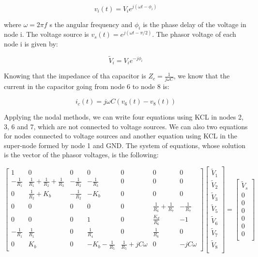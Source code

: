 \begin{equation}
  v_i(t) = V_i e^{j(\omega t - \phi_i)}
\end{equation}

where $\omega = 2\pi f$ s the angular frequency and $\phi_i$ is the phase delay of the voltage in node i. The voltage source is $v_s(t) = e^{j(\omega t - \pi/2)}$. The phasor voltage of each node i is given by:

\begin{equation}
  \widetilde{V}_i = V_i e^{-j\phi_i}
\end{equation}

Knowing that the impedance of tha capacitor is $Z_c = \frac{1}{j \omega C}$, we know that the current in the capacitor going from node 6 to node 8 is:

\begin{equation}
  i_c(t) = j \omega C (v_6(t)-v_8(t))
\end{equation}

Applying the nodal methods, we can write four equations using KCL in nodes 2, 3, 6 and 7, which are not connected to voltage sources. We can also two equations for nodes connected to voltage sources and another equation using KCL in the super-node formed by node 1 and GND. The system of equations, whose solution is the vector of the phasor voltages, is the following:

\[
{\begin{bmatrix}
1 & 0 & 0 & 0 & 0 & 0 & 0\\
-\frac{1}{R_1} & \frac{1}{R_1}+\frac{1}{R_2}+\frac{1}{R_3} & -\frac{1}{R_2} & -\frac{1}{R_3} & 0 & 0 & 0\\
0 & \frac{1}{R_2}+K_b & -\frac{1}{R_2} & -K_b & 0 & 0 & 0\\
0 & 0 & 0 & 0 & 0 & \frac{1}{R_6}+\frac{1}{R_7} & -\frac{1}{R_7}\\
0 & 0 & 0 & 1 & 0 & \frac{K_d}{R_6} & -1\\
-\frac{1}{R_1} & \frac{1}{R_1} & 0 & \frac{1}{R_4} & 0 & \frac{1}{R_6} & 0\\
0 & K_b & 0 & -K_b-\frac{1}{R_5} & \frac{1}{R_5}+jC\omega & 0 & -jC\omega
            \end{bmatrix}
            }
{\begin{bmatrix}
\widetilde{V}_1\\
\widetilde{V}_2\\
\widetilde{V}_3\\
\widetilde{V}_5\\
\widetilde{V}_6\\
\widetilde{V}_7\\
\widetilde{V}_8\\
            \end{bmatrix}
            }
    =
{\begin{bmatrix}
\widetilde{V}_s\\
0\\
0\\
0\\
0\\
0\\
0\\
            \end{bmatrix}
            }
\]

